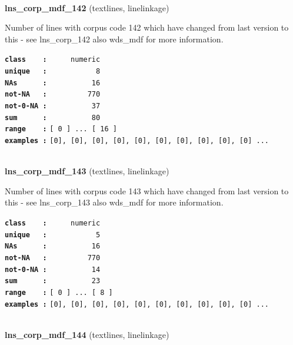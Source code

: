 \documentclass[]{article}
\begin{document}
~

\textbf{lns\_corp\_mdf\_142} (textlines, linelinkage)

Number of lines with corpus code 142 which have changed from last
version to this - see lns\_corp\_142 also wds\_mdf for more information.

\textbf{\texttt{class\ \ \ \ :}} \texttt{~~~~~numeric}\\
\textbf{\texttt{unique\ \ \ :}} \texttt{~~~~~~~~~~~8}\\
\textbf{\texttt{NAs\ \ \ \ \ \ :}} \texttt{~~~~~~~~~~16}\\
\textbf{\texttt{not-NA\ \ \ :}} \texttt{~~~~~~~~~770}\\
\textbf{\texttt{not-0-NA\ :}} \texttt{~~~~~~~~~~37}\\
\textbf{\texttt{sum\ \ \ \ \ \ :}} \texttt{~~~~~~~~~~80}\\
\textbf{\texttt{range\ \ \ \ :}}
\texttt{{[}\ 0\ {]}\ ...\ {[}\ 16\ {]}}\\
\textbf{\texttt{examples\ :}}
\texttt{{[}0{]},\ {[}0{]},\ {[}0{]},\ {[}0{]},\ {[}0{]},\ {[}0{]},\ {[}0{]},\ {[}0{]},\ {[}0{]},\ {[}0{]}\ ...}\\

~

\textbf{lns\_corp\_mdf\_143} (textlines, linelinkage)

Number of lines with corpus code 143 which have changed from last
version to this - see lns\_corp\_143 also wds\_mdf for more information.

\textbf{\texttt{class\ \ \ \ :}} \texttt{~~~~~numeric}\\
\textbf{\texttt{unique\ \ \ :}} \texttt{~~~~~~~~~~~5}\\
\textbf{\texttt{NAs\ \ \ \ \ \ :}} \texttt{~~~~~~~~~~16}\\
\textbf{\texttt{not-NA\ \ \ :}} \texttt{~~~~~~~~~770}\\
\textbf{\texttt{not-0-NA\ :}} \texttt{~~~~~~~~~~14}\\
\textbf{\texttt{sum\ \ \ \ \ \ :}} \texttt{~~~~~~~~~~23}\\
\textbf{\texttt{range\ \ \ \ :}}
\texttt{{[}\ 0\ {]}\ ...\ {[}\ 8\ {]}}\\
\textbf{\texttt{examples\ :}}
\texttt{{[}0{]},\ {[}0{]},\ {[}0{]},\ {[}0{]},\ {[}0{]},\ {[}0{]},\ {[}0{]},\ {[}0{]},\ {[}0{]},\ {[}0{]}\ ...}\\

~

\textbf{lns\_corp\_mdf\_144} (textlines, linelinkage)
\end{document}
